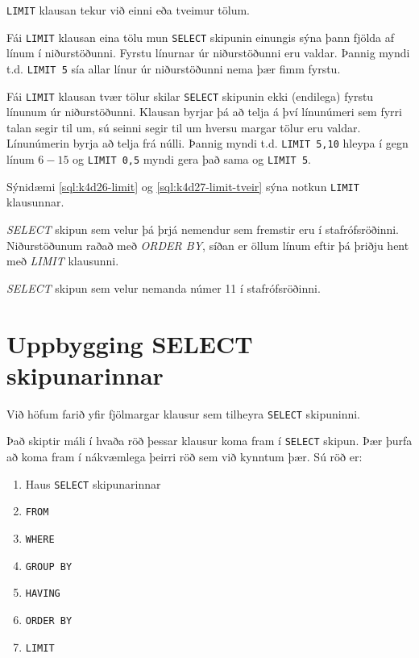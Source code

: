 \verb|LIMIT| klausan tekur við einni eða tveimur tölum. 

Fái \verb|LIMIT| klausan eina tölu mun \verb|SELECT| skipunin einungis sýna þann fjölda af línum í niðurstöðunni. Fyrstu línurnar úr niðurstöðunni eru valdar. Þannig myndi t.d. \verb|LIMIT 5| sía allar línur úr niðurstöðunni nema þær fimm fyrstu.

Fái \verb|LIMIT| klausan tvær tölur skilar \verb|SELECT| skipunin ekki (endilega) fyrstu línunum úr niðurstöðunni. Klausan byrjar þá að telja á því línunúmeri sem fyrri talan segir til um, sú seinni segir til um hversu margar tölur eru valdar. Línunúmerin byrja að telja frá núlli. Þannig myndi t.d. \verb|LIMIT 5,10| hleypa í gegn línum $6-15$ og \verb|LIMIT 0,5| myndi gera það sama og \verb|LIMIT 5|.

Sýnidæmi \ref{sql:k4d26-limit} og \ref{sql:k4d27-limit-tveir} sýna notkun \verb|LIMIT| klausunnar.

\begin{example}
\caption[LIMIT]{\emph{SELECT} skipun sem velur þá þrjá nemendur sem fremstir eru í stafrófsröðinni. Niðurstöðunum raðað með \emph{ORDER BY}, síðan er öllum línum eftir þá þriðju hent með \emph{LIMIT} klausunni.}
\label{sql:k4d26-limit}
\centering
{}
\end{example}

\begin{example}
\caption[LIMIT með tveimur tölum]{\emph{SELECT} skipun sem velur nemanda númer 11 í stafrófsröðinni.}
\label{sql:k4d27-limit-tveir}
\centering
{}
\end{example}
\section{Uppbygging SELECT skipunarinnar}
Við höfum farið yfir fjölmargar klausur sem tilheyra \verb|SELECT| skipuninni.

Það skiptir máli í hvaða röð þessar klausur koma fram í \verb|SELECT| skipun. Þær þurfa að koma fram í nákvæmlega þeirri röð sem við kynntum þær. Sú röð er:

\begin{enumerate}
 \setcounter{enumi}{0}
 \item Haus \verb|SELECT| skipunarinnar
 \item \verb|FROM|
 \item \verb|WHERE|
 \item \verb|GROUP BY|
 \item \verb|HAVING|
 \item \verb|ORDER BY|
 \item \verb|LIMIT|
\end{enumerate}

